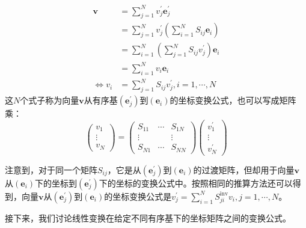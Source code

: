 \documentclass[main.tex]{subfiles}
\begin{document}
\begin{align*}
\mathbf{v}&=\sum_{j=1}^Nv^\prime_j\mathbf{e}^\prime_j\\
&=\sum_{j=1}^Nv^\prime_j\left(\sum_{i=1}^NS_{ij}\mathbf{e}_i\right)\\
&=\sum_{i=1}^N\left(\sum_{j=1}^N S_{ij}v^\prime_j\right)\mathbf{e}_i\\
&=\sum_{i=1}^Nv_i\mathbf{e}_i\\
\Leftrightarrow v_i&=\sum_{j=1}^NS_{ij}v^\prime_j,i=1,\cdots,N
\end{align*}
这$N$个式子称为向量$\mathbf{v}$从有序基$\left(\mathbf{e}^\prime_j\right)$到$\left(\mathbf{e}_i\right)$的坐标变换公式，也可以写成矩阵乘：
\[\left(\begin{array}{c}v_1\\\vdots\\v_N\end{array}\right)=\left(\begin{array}{ccc}S_{11}&\cdots&S_{1N}\\\vdots&&\vdots\\S_{N1}&\cdots&S_{NN}\end{array}\right)\left(\begin{array}{c}v^\prime_1\\\vdots\\v^\prime_N\end{array}\right)\]

注意到，对于同一个矩阵$S_{ij}$，它是从$\left(\mathbf{e}^\prime_j\right)$到$\left(\mathbf{e}_i\right)$的过渡矩阵，但却用于向量$\mathbf{v}$从$\left(\mathbf{e}_i\right)$下的坐标到$\left(\mathbf{e}^\prime_j\right)$下的坐标的变换公式中。按照相同的推算方法还可以得到，向量$\mathbf{v}$从$\left(\mathbf{e}^\prime_j\right)$到$\left(\mathbf{e}_i\right)$的坐标变换公式是$v^\prime_j=\sum_{i=1}^NS^\mathrm{inv}_{ji}v_i,j=1,\cdots,N$。

接下来，我们讨论线性变换在给定不同有序基下的坐标矩阵之间的变换公式。
\end{document}
